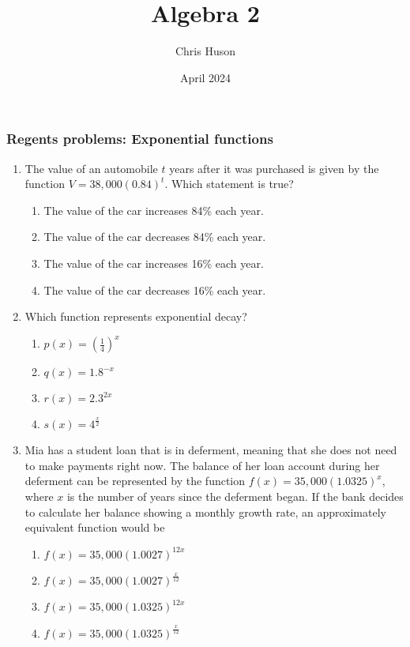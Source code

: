 \documentclass[12pt, twoside]{article}
\title{Algebra 2}
\author{Chris Huson}
\date{April 2024}
\begin{document}
\subsubsection*{Regents problems: Exponential functions}
\begin{enumerate}[itemsep=0.5cm]
\item The value of an automobile $t$ years after it was purchased is given by the function $V = 38,000(0.84)^t$. Which statement is true? %
\begin{enumerate}
    \item The value of the car increases 84\% each year.
    \item The value of the car decreases 84\% each year.
    \item The value of the car increases 16\% each year.
    \item The value of the car decreases 16\% each year.
\end{enumerate}

\item Which function represents exponential decay? %
\begin{enumerate}
    \item $\displaystyle p(x) = \left(\frac{1}{4}\right)^x$
    \item $q(x) = 1.8^{-x}$
    \item $r(x) = 2.3^{2x}$
    \item $s(x) = 4^{\frac{x}{2}}$
\end{enumerate}

\item  %
Mia has a student loan that is in deferment, meaning that she does
not need to make payments right now. The balance of her loan
account during her deferment can be represented by the function
$f(x) = 35,000 (1.0325)^x$, where $x$ is the number of years since the
deferment began. If the bank decides to calculate her balance showing
a monthly growth rate, an approximately equivalent function would be
\begin{enumerate}
    \item $f(x) = 35,000 (1.0027)^{12x}$
    \item $\displaystyle f(x) = 35,000 (1.0027)^{\frac{x}{12}}$
    \item $f(x) = 35,000 (1.0325)^{12x}$
    \item $\displaystyle f(x) = 35,000 (1.0325)^{\frac{x}{12}}$
\end{enumerate}


\end{enumerate}
\end{document}
